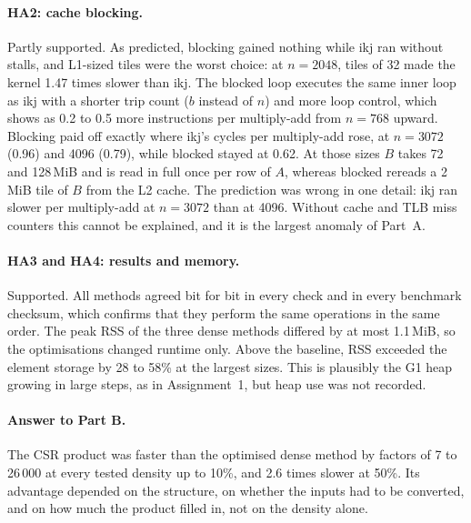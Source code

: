 \documentclass[11pt,a4paper]{article}
\begin{document}
\paragraph{HA2: cache blocking.} Partly supported. As predicted, blocking
gained nothing while ikj ran without stalls, and L1-sized tiles were the worst
choice: at $n=2048$, tiles of 32 made the kernel 1.47 times slower than ikj. The
blocked loop executes the same inner loop as ikj with a shorter trip count
($b$ instead of $n$) and more loop control, which shows as 0.2 to 0.5 more
instructions per multiply-add from $n=768$ upward. Blocking paid off exactly where ikj's cycles per
multiply-add rose, at $n=3072$ (0.96) and 4096 (0.79), while blocked stayed at
0.62. At those sizes $B$ takes 72 and 128\,MiB and is read in full once per row
of $A$, whereas blocked rereads a 2\,MiB tile of $B$ from the L2 cache. The
prediction was wrong in one detail: ikj ran slower per multiply-add at
$n=3072$ than at 4096. Without cache and TLB miss counters this cannot be
explained, and it is the largest anomaly of Part~A.

\paragraph{HA3 and HA4: results and memory.} Supported. All methods agreed bit
for bit in every check and in every benchmark checksum, which confirms that
they perform the same operations in the same order. The peak RSS of the three
dense methods differed by at most 1.1\,MiB, so the optimisations changed
runtime only. Above the baseline, RSS exceeded the element storage by 28 to
58\% at the largest sizes. This is plausibly the G1 heap growing in large steps,
as in Assignment~1, but heap use was not recorded.

\paragraph{Answer to Part B.} The CSR product was faster than the optimised
dense method by factors of 7 to 26\,000 at every tested density up to 10\%, and
2.6 times slower at 50\%. Its advantage depended on the structure, on whether
the inputs had to be converted, and on how much the product filled in, not on
the density alone.
\end{document}
